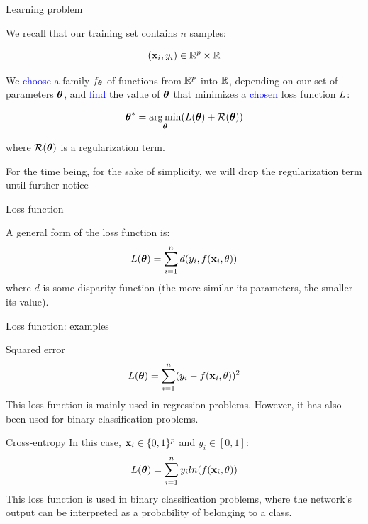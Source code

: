 \documentclass[xcolor=pdftex,dvipsnames,table,mathserif]{beamer}
\begin{document}
\begin{frame}{Learning problem}

  We recall that our training set contains $n$ samples:

  \[
  (\mathbf{x}_i, y_i) \in \mathbb{R}^p \times \mathbb{R}
  \]

  We \textcolor{blue}{choose} a family $f_{\boldsymbol{\theta}}$
  of functions from $\mathbb{R}^p$ into $\mathbb{R}$,
  depending on our set of parameters $\boldsymbol{\theta}$,
  and \textcolor{blue}{find} the value of $\boldsymbol{\theta}$
  that minimizes a \textcolor{blue}{chosen} loss function $L$:

\[
\boldsymbol{\theta} ^{\ast} = \operatorname*{arg\,min}_{\boldsymbol{\theta}} ( L (\boldsymbol{\theta}) + \mathcal{R}(\boldsymbol{\theta}) )
\]

where $\mathcal{R}(\boldsymbol{\theta})$ is a regularization term.

\vspace{1em}

\small{For the time being, for the sake of simplicity, we will drop the regularization term until further notice}

\end{frame}

\begin{frame}{Loss function}

  A general form of the loss function is:
  \[
  L(\boldsymbol{\theta}) = \sum\limits_{i=1}^n d(y_i, f(\mathbf{x}_i, \theta))
  \]
  where $d$ is some disparity function (the more similar its parameters, the smaller its value).

\end{frame}


\begin{frame}{Loss function: examples}


  \begin{block}{Squared error}
    \[
    L(\boldsymbol{\theta}) = \sum\limits_{i=1}^n (y_i - f(\mathbf{x}_i, \theta))^2
    \]
    This loss function is mainly used in regression problems. However, it has also been used for binary classification problems.
  \end{block}

  \begin{block}{Cross-entropy}
    In this case, $\mathbf{x}_i \in \{0, 1\}^p$ and $y_i \in [0, 1]$:
    \[
    L(\boldsymbol{\theta}) = \sum\limits_{i=1}^n y_i ln( f(\mathbf{x}_i, \theta) )
    \]
    This loss function is used in binary classification problems, where the network's output can be interpreted as a probability of belonging to a class.
  \end{block}

\end{frame}
\end{document}
